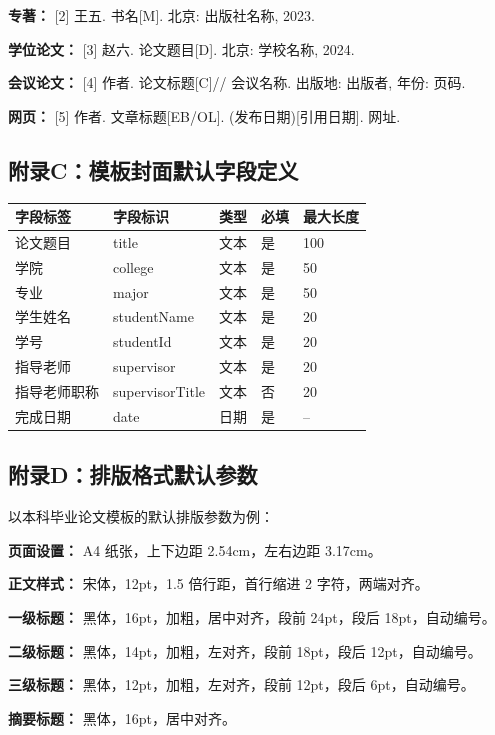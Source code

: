 \documentclass{softeng}
\begin{document}
\textbf{专著：}
[2] 王五. 书名[M]. 北京: 出版社名称, 2023.

\textbf{学位论文：}
[3] 赵六. 论文题目[D]. 北京: 学校名称, 2024.

\textbf{会议论文：}
[4] 作者. 论文标题[C]// 会议名称. 出版地: 出版者, 年份: 页码.

\textbf{网页：}
[5] 作者. 文章标题[EB/OL]. (发布日期)[引用日期]. 网址.

\subsection{附录C：模板封面默认字段定义}
\begin{tabular}{|p{2.5cm}|p{2cm}|p{1.5cm}|p{1.2cm}|p{1.5cm}|}
	\hline
	\textbf{字段标签} & \textbf{字段标识} & \textbf{类型} & \textbf{必填} & \textbf{最大长度} \\
	\hline
	论文题目 & title & 文本 & 是 & 100 \\
	\hline
	学院 & college & 文本 & 是 & 50 \\
	\hline
	专业 & major & 文本 & 是 & 50 \\
	\hline
	学生姓名 & studentName & 文本 & 是 & 20 \\
	\hline
	学号 & studentId & 文本 & 是 & 20 \\
	\hline
	指导老师 & supervisor & 文本 & 是 & 20 \\
	\hline
	指导老师职称 & supervisorTitle & 文本 & 否 & 20 \\
	\hline
	完成日期 & date & 日期 & 是 & -- \\
	\hline
\end{tabular}

\subsection{附录D：排版格式默认参数}
以本科毕业论文模板的默认排版参数为例：

\textbf{页面设置：} A4 纸张，上下边距 2.54cm，左右边距 3.17cm。

\textbf{正文样式：} 宋体，12pt，1.5 倍行距，首行缩进 2 字符，两端对齐。

\textbf{一级标题：} 黑体，16pt，加粗，居中对齐，段前 24pt，段后 18pt，自动编号。

\textbf{二级标题：} 黑体，14pt，加粗，左对齐，段前 18pt，段后 12pt，自动编号。

\textbf{三级标题：} 黑体，12pt，加粗，左对齐，段前 12pt，段后 6pt，自动编号。

\textbf{摘要标题：} 黑体，16pt，居中对齐。
\end{document}
